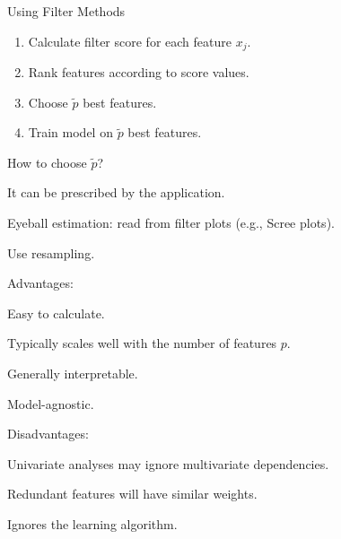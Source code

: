 \documentclass[11pt,compress,t,notes=noshow, xcolor=table]{beamer}
\begin{document}
\begin{vbframe}{Using Filter Methods}

  \begin{enumerate}{}
  \setlength{\itemsep}{1.2em}
    \item Calculate filter score for each feature $x_j$.
    \item Rank features according to score values.
    \item Choose $\tilde{p}$ best features.
    \item Train model on $\tilde{p}$ best features.
  \end{enumerate}

  \lz

  \begin{blocki}{How to choose $\tilde{p}$?}
    \item It can be prescribed by the application.
    \item Eyeball estimation: read from filter plots (e.g., Scree plots).
    \item Use resampling.
  \end{blocki}

  \framebreak

  \begin{blocki}{Advantages:}
  \setlength{\itemsep}{1.2em}
    \item Easy to calculate.
    \item Typically scales well with the number of features $p$.
    \item Generally interpretable.
    \item Model-agnostic.
  \end{blocki}

  \begin{blocki}{Disadvantages:}
  \setlength{\itemsep}{1.2em}
    \item Univariate analyses may ignore multivariate dependencies.
    \item Redundant features will have similar weights.
    \item Ignores the learning algorithm.
  \end{blocki}
  \end{vbframe}


  
  
\end{document}
